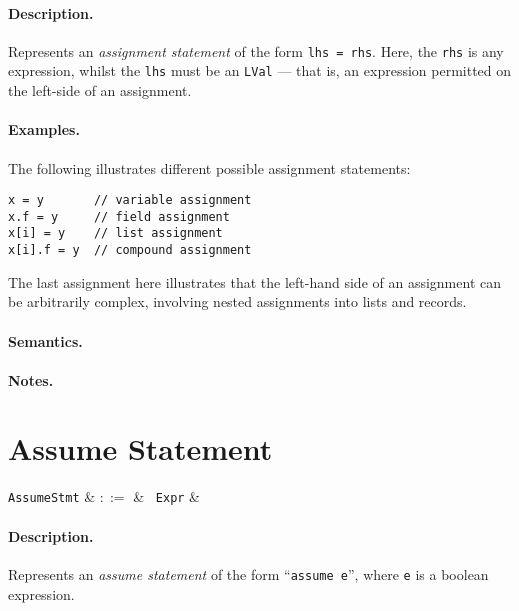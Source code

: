 \paragraph{Description.}  Represents an {\em assignment statement} of the
form \lstinline{lhs = rhs}.  Here, the \lstinline{rhs} is any
expression, whilst the \lstinline{lhs} must be an \lstinline{LVal} ---
that is, an expression permitted on the left-side of an assignment.

\paragraph{Examples.} The following illustrates different possible assignment statements:
\begin{lstlisting}
x = y       // variable assignment
x.f = y     // field assignment
x[i] = y    // list assignment
x[i].f = y  // compound assignment
\end{lstlisting}

The last assignment here illustrates that the left-hand side of an
assignment can be arbitrarily complex, involving nested assignments
into lists and records.

\paragraph{Semantics.}

\paragraph{Notes.} 


\section{Assume Statement}

\begin{syntax}
  \verb+AssumeStmt+ & $::=$ & \ \verb+Expr+ &\\
\end{syntax}

\paragraph{Description.}  Represents an {\em assume statement} of the form
``\lstinline{assume e}'', where \lstinline{e} is a boolean expression. 

